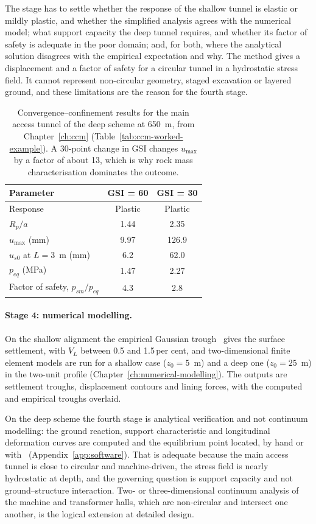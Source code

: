 The stage has to settle whether the response of the shallow tunnel is elastic
or mildly plastic, and whether the simplified analysis agrees with the
numerical model; what support capacity the deep tunnel requires, and whether
its factor of safety is adequate in the poor domain; and, for both, where the
analytical solution disagrees with the empirical expectation and why. The
method gives a displacement and a factor of safety for a circular tunnel in a
hydrostatic stress field. It cannot represent non-circular geometry, staged
excavation or layered ground, and these limitations are the reason for the
fourth stage.

\begin{table}[htbp]
\caption{Convergence--confinement results for the main access tunnel of the deep scheme at 650~m, from Chapter~\ref{ch:ccm} (Table~\ref{tab:ccm-worked-example}). A 30-point change in GSI changes $u_{\max}$ by a factor of about 13, which is why rock mass characterisation dominates the outcome.}
\label{tab:integrated-ccm-results}
\centering
\small
\begin{tabular}{l c c}
\toprule
\textbf{Parameter} & \textbf{GSI = 60} & \textbf{GSI = 30} \\
\midrule
Response & Plastic & Plastic \\
$R_p/a$ & 1.44 & 2.35 \\
$u_{\max}$ (mm) & 9.97 & 126.9 \\
$u_{s0}$ at $L=3$~m (mm) & 6.2 & 62.0 \\
$p_{eq}$ (MPa) & 1.47 & 2.27 \\
Factor of safety, $p_{sm}/p_{eq}$ & 4.3 & 2.8 \\
\bottomrule
\end{tabular}
\end{table}

\paragraph{Stage 4: numerical modelling.}
On the shallow alignment the empirical Gaussian
trough~\citep{mair1996settlement} gives the surface settlement, with $V_L$
between 0.5 and 1.5\,per cent, and two-dimensional finite element models are
run for a shallow case ($z_0=5$~m) and a deep one ($z_0=25$~m) in the
two-unit profile (Chapter~\ref{ch:numerical-modelling}). The outputs are
settlement troughs, displacement contours and lining forces, with the
computed and empirical troughs overlaid.

On the deep scheme the fourth stage is analytical verification and not
continuum modelling: the ground reaction, support characteristic and
longitudinal deformation curves are computed and the equilibrium point
located, by hand or with \companionname\ (Appendix~\ref{app:software}). That
is adequate because the main access tunnel is close to circular and
machine-driven, the stress field is nearly hydrostatic at depth, and the
governing question is support capacity and not ground--structure
interaction. Two- or three-dimensional continuum analysis of the machine and
transformer halls, which are non-circular and intersect one another, is the
logical extension at detailed design.

